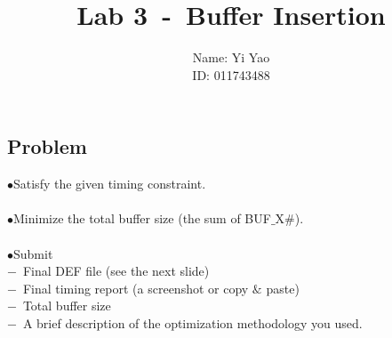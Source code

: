 \documentclass[a4paper,11pt]{article}
\begin{document}
\title{\Large{\textbf{Lab 3\ -\ Buffer Insertion}}}
\author{Name: Yi Yao\\ID: 011743488}
\date{}
\maketitle

\begin{flushleft}
\section*{Problem}
$\bullet$\quad Satisfy the given timing constraint.\\
\hspace*{\fill} \\
$\bullet$\quad Minimize the total buffer size (the sum of BUF$\_$X$\#$).\\
\hspace*{\fill} \\
$\bullet$\quad Submit\\
\hspace*{0.7cm}$-$\ Final DEF file (see the next slide)\\
\hspace*{0.7cm}$-$\ Final timing report (a screenshot or copy $\&$ paste)\\
\hspace*{0.7cm}$-$\ Total buffer size\\
\hspace*{0.7cm}$-$\ A brief description of the optimization methodology you used.\\
\hspace*{\fill} \\


\end{flushleft}
\end{document}
